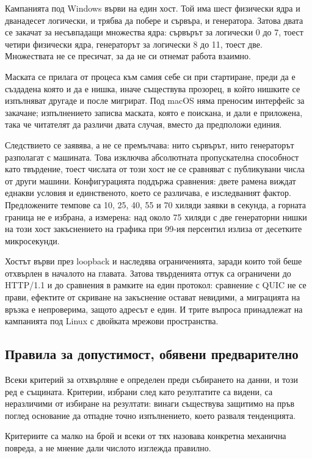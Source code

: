 Кампанията под Windows върви на един хост. Той има шест физически ядра и дванадесет логически,
и трябва да побере и сървъра, и генератора. Затова двата се закачат за несъвпадащи множества
ядра: сървърът за логически 0 до 7, тоест четири физически ядра, генераторът за логически 8 до
11, тоест две. Множествата не се пресичат, за да не си отнемат работа взаимно.

Маската се прилага от процеса към самия себе си при стартиране, преди да е създадена която и
да е нишка, иначе съществува прозорец, в който нишките се изпълняват другаде и после мигрират.
Под macOS няма преносим интерфейс за закачане; изпълнението записва маската, която е поискана,
и дали е приложена, така че читателят да различи двата случая, вместо да предположи единия.

Следствието се заявява, а не се премълчава: нито сървърът, нито генераторът разполагат с
машината. Това изключва абсолютната пропускателна способност като твърдение, тоест числата от
този хост не се сравняват с публикувани числа от други машини. Конфигурацията поддържа
сравнения: двете рамена виждат еднакви условия и единственото, което се различава, е
изследваният фактор. Предложените темпове са 10, 25, 40, 55 и 70 хиляди заявки в секунда, а
горната граница не е избрана, а измерена: над около 75 хиляди с две генераторни нишки на този
хост закъснението на графика при 99-ия персентил излиза от десетките микросекунди.

Хостът върви през loopback и наследява ограниченията, заради които той беше отхвърлен в
началото на главата. Затова твърденията оттук са ограничени до HTTP/1.1 и до сравнения в
рамките на един протокол: сравнение с QUIC не се прави, ефектите от скриване на закъснение
остават невидими, а миграцията на връзка е непроверима, защото адресът е един. И трите въпроса
принадлежат на кампанията под Linux с двойката мрежови пространства.

\subsection{Правила за допустимост, обявени предварително}

Всеки критерий за отхвърляне е определен преди събирането на данни, и този ред е същината.
Критерии, избрани след като резултатите са видени, са неразличими от избиране на резултати:
винаги съществува защитимо на пръв поглед основание да отпадне точно изпълнението, което
разваля тенденцията.

Критериите са малко на брой и всеки от тях назовава конкретна механична повреда, а не
мнение дали числото изглежда правилно.


